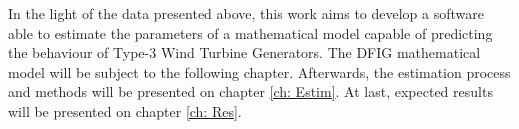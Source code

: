 In the light of the data presented above, this work aims to develop a software able to estimate the parameters of a mathematical model capable of predicting the behaviour of Type-3 Wind Turbine Generators. The DFIG mathematical model will be subject to the following chapter. Afterwards, the estimation process and methods will be presented on chapter \ref{ch: Estim}. At last, expected results will be presented on chapter \ref{ch: Res}.

